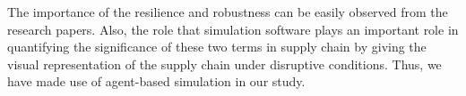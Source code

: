 The importance of the resilience and robustness can be easily observed from the research papers. Also, the role that simulation software plays an important role in quantifying the significance of these two terms in supply chain by giving the visual representation of the supply chain under disruptive conditions. Thus, we have made use of agent-based simulation in our study.
